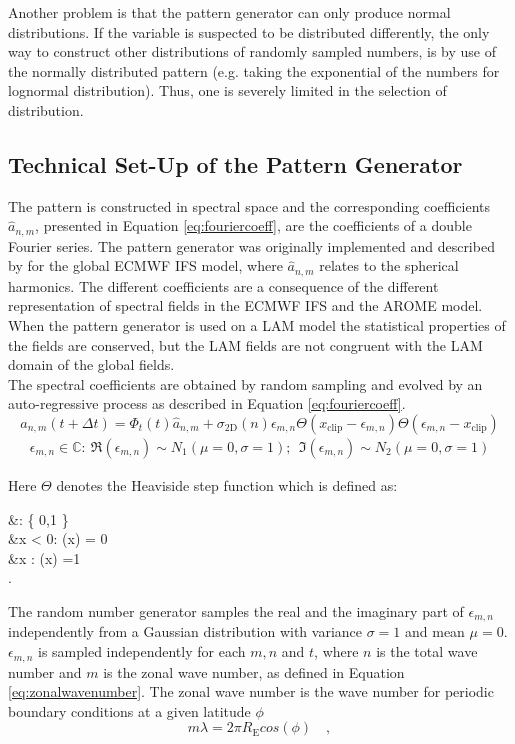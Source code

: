 Another problem is that the pattern generator can only produce normal distributions. If the variable is suspected to be distributed differently, the only way to construct other distributions of randomly sampled numbers, is by use of the normally distributed pattern (e.g. taking the exponential of the numbers for lognormal distribution). Thus, one is severely limited in the selection of distribution. 

\subsection{Technical Set-Up of the Pattern Generator}

The pattern is constructed in spectral space and the corresponding coefficients $\hat{a}_{n,m}$, presented in Equation \eqref{eq:fouriercoeff}, are the coefficients of a double Fourier series. The pattern generator was originally implemented and described by \citeauthor{palmer2009stochastic} \cite{palmer2009stochastic} for the global ECMWF IFS model, where $\hat{a}_{n,m}$ relates to the spherical harmonics. The different coefficients are a consequence of the different representation of spectral fields in the ECMWF IFS and the AROME model. When the pattern generator is used on a LAM model the statistical properties of the fields are conserved, but the LAM fields are not congruent with the LAM domain of the global fields.\\
The spectral coefficients are obtained by random sampling and evolved by an auto-regressive process as described in Equation \eqref{eq:fouriercoeff}. 
\begin{equation}
\label{eq:fouriercoeff}
    \hat{a}_{n,m}(t+ \Delta t)= \Phi_{t} (t) \hat{a}_{n,m} +\sigma_{\mathrm{2D}}(n) \epsilon_{m,n} \Theta(x_{\mathrm{clip}}-\epsilon_{m,n})\Theta(\epsilon_{m,n} -x_{\mathrm{clip}})
\end{equation}
\begin{align*}
    \epsilon_{m,n} \in \mathbb{C}: \ 
 \Re(\epsilon_{m,n}) 
\sim N_{1}( \mu=0, \sigma=1); \  \
\Im(\epsilon_{m,n})
\sim N_{2}( \mu=0, \sigma=1)
\end{align*}

Here $ \Theta$ denotes the Heaviside step function which is defined as: 
\begin{flalign*}
&\Theta : \mathbb{R} \rightarrow \{ 0,1 \} \\
&x < 0: \Theta(x) = 0\\
&x \geq 0 : \Theta(x) =1\\ \quad .
\end{flalign*}
The random number generator samples the real and the imaginary part of  $\epsilon_{m,n}$ independently from a Gaussian distribution with variance $\sigma=1$ and mean $\mu=0$. $\epsilon_{m,n}$ is sampled independently for each $ m,n$ and $t$, where $n$ is the total wave number and $m$ is the zonal wave number, as defined in Equation \eqref{eq:zonalwavenumber}. The zonal wave number is the wave number for periodic boundary conditions at a given latitude $\phi$
\begin{equation}
m \lambda=2 \pi R_{\mathrm{E}} cos(\phi) \quad ,
\label{eq:zonalwavenumber}
\end{equation}

